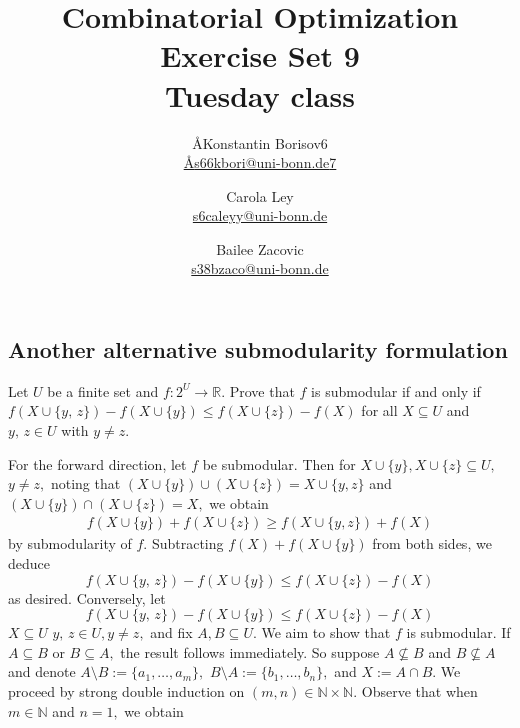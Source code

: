 \documentclass{article}
\title{Combinatorial Optimization \\ Exercise Set 9 \\ Tuesday class}
\author{
  \AA{Konstantin Borisov}{6} \\
  \href{mailto:\AA{s66kbori@uni-bonn.de}{7}}{\AA{s66kbori@uni-bonn.de}{7}}
  \and
  Carola Ley \\
  \href{mailto:s6caleyy@uni-bonn.de}{s6caleyy@uni-bonn.de}
  \and
  Bailee Zacovic \\
  \href{mailto:s38bzaco@uni-bonn.de}{s38bzaco@uni-bonn.de}
}
\newcommand{\N}{\mathbb{N}}
\newcommand{\R}{\mathbb{R}}
\begin{document}
  \maketitle

  \setcounter{section}{9}
  \subsection{Another alternative submodularity formulation}
  \begin{centerframebox}
    Let $U$ be a finite set and $f : 2^U \to \R$. Prove that $f$ is submodular
    if and only if $f(X \cup \{y,\, z\}) - f(X \cup \{y\}) \leq f(X \cup \{z\}) - f(X)$ for all $X \subseteq U$ and
    $y,\, z \in U$ with $y \neq z$.
  \end{centerframebox}
  For the forward direction, let $f$ be submodular. Then for $X\cup \{y\},X\cup \{z\}\subseteq U,$ $y\neq z,$ noting that $(X\cup \{y\})\cup (X\cup \{z\})=X\cup \{y,z\}$ and $(X\cup \{y\})\cap (X\cup \{z\})=X,$ we obtain
  \begin{align*}
      f(X\cup \{y\})+f(X\cup \{z\})\geq f(X\cup \{y,z\})+f(X)
  \end{align*}
  by submodularity of $f$. Subtracting $f(X)+f(X\cup \{y\})$ from both sides, we deduce
  $$f(X \cup \{y,\, z\}) - f(X \cup \{y\}) \leq f(X \cup \{z\}) - f(X)$$as desired. Conversely, let
  \begin{equation}f(X \cup \{y,\, z\}) - f(X \cup \{y\}) \leq f(X \cup \{z\}) - f(X)\end{equation} $X \subseteq U$     $y,\, z \in U, y \neq z,$ and fix $A,B\subseteq U$. We aim to show that $f$ is submodular. If $A\subseteq B$ or $B\subseteq A,$ the result follows immediately. So suppose $A \not\subseteq B$ and $ B \not\subseteq A$ and denote $A\setminus B:=\{a_1,\dots,a_m\},$ $B\setminus A:=\{b_1,\dots,b_n\},$ and $X:=A\cap B.$ We proceed by strong double induction on $(m,n)\in \mathbb{N}\times \N.$ Observe that when $m\in \mathbb{N}$ and $n=1,$ we obtain
\end{document}
